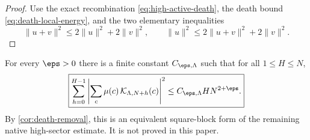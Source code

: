 \begin{proof}
Use the exact recombination \cref{eq:high-active-death}, the death bound \cref{eq:death-local-energy}, and the two elementary inequalities
\[
 \|u+v\|^2\le2\|u\|^2+2\|v\|^2,
 \qquad
 \|u\|^2\le2\|u+v\|^2+2\|v\|^2.
\]
\end{proof}

\begin{conjecture}
\label{conj:survivor-power-saving}
For every $\eps>0$ there is a finite constant $C_{\eps,\Lambda}$ such that for all $1\le H\le N$,
\begin{equation}
 \boxed{
 \sum_{h=0}^{H-1}
 \left|
 \sum_{c}\mu(c)\,\mathcal K_{\Lambda,N+h}(c)
 \right|^2
 \le C_{\eps,\Lambda}H N^{2+\eps}.
 }
 \label{eq:survivor-power-saving}
\end{equation}
By \cref{cor:death-removal}, this is an equivalent square-block form of the remaining native high-sector estimate.  It is not proved in this paper.
\end{conjecture}

